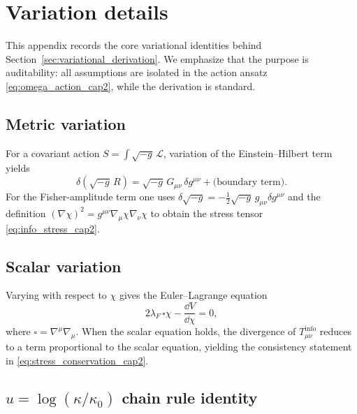 \section{Variation details}
\label{app:variation_details}

This appendix records the core variational identities behind Section~\ref{sec:variational_derivation}.
We emphasize that the purpose is auditability: all assumptions are isolated in the action ansatz \eqref{eq:omega_action_cap2}, while the derivation is standard.

\subsection{Metric variation}
\label{app:metric_variation}

For a covariant action $S=\int\sqrt{-g}\,\mathcal{L}$, variation of the Einstein--Hilbert term yields
\begin{equation}
  \delta\left(\sqrt{-g}\,R\right)
  = \sqrt{-g}\,G_{\mu\nu}\,\delta g^{\mu\nu} + \text{(boundary term)}.
\end{equation}
For the Fisher-amplitude term one uses $\delta\sqrt{-g}=-\frac12\sqrt{-g}\,g_{\mu\nu}\delta g^{\mu\nu}$ and the definition $(\nabla\chi)^2=g^{\mu\nu}\nabla_\mu\chi\nabla_\nu\chi$ to obtain the stress tensor \eqref{eq:info_stress_cap2}.

\subsection{Scalar variation}
\label{app:scalar_variation}

Varying with respect to $\chi$ gives the Euler--Lagrange equation
\begin{equation}
  2\lambda_F\,\square\chi-\frac{\dd V}{\dd\chi}=0,
\end{equation}
where $\square=\nabla^\mu\nabla_\mu$.
When the scalar equation holds, the divergence of $T^{\mathrm{info}}_{\mu\nu}$ reduces to a term proportional to the scalar equation, yielding the consistency statement in \eqref{eq:stress_conservation_cap2}.

\subsection{\texorpdfstring{$u=\log(\kappa/\kappa_0)$}{u=log(kappa/kappa0)} chain rule identity}
\label{app:u_chain_rule}

